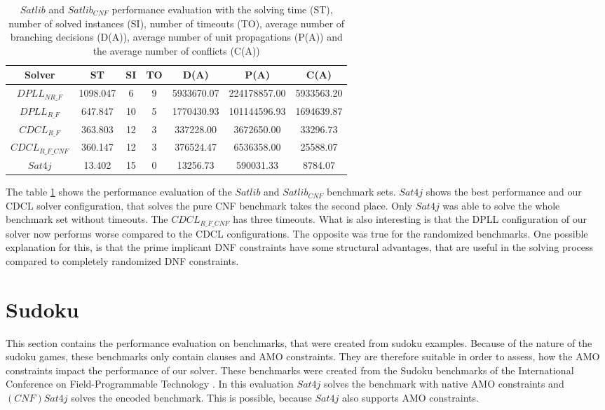 \begin{table}[htb]
\centering
\caption[$Satlib$ and $Satlib_{CNF}$ performance evaluation]{$Satlib$ and $Satlib_{CNF}$ performance evaluation with the solving time (ST), number of solved instances (SI), number of timeouts (TO), average number of branching decisions (D(A)), average number of unit propagations (P(A)) and the average number of conflicts (C(A))}
\label{tab:satlibSat}
\begin{tabular}{|c|c|c|c|c|c|c|}
\hline
Solver & ST & SI & TO & D(A) & P(A) & C(A)\\ 
\hline
$DPLL_{NR\_F}$ & 1098.047 & 6 & 9 & 5933670.07 & 224178857.00 & 5933563.20 \\ 
\hline
$DPLL_{R\_F}$ & 647.847 & 10 & 5 & 1770430.93 & 101144596.93 & 1694639.87 \\ 
\hline
$CDCL_{R\_F}$ & 363.803 & 12 & 3 & 337228.00 & 3672650.00 & 33296.73 \\ 
\hline
$CDCL_{R\_F\_CNF}$ & 360.147 & 12 & 3 & 376524.47 & 6536358.00 & 25588.07 \\ 
\hline
$Sat4j$ & 13.402 & 15 & 0 & 13256.73 & 590031.33 & 8784.07 \\ 
\hline
\end{tabular}
\end{table}

The table \ref{tab:satlibSat} shows the performance evaluation of the $Satlib$ and $Satlib_{CNF}$ benchmark sets. $Sat4j$ shows the best performance and our CDCL solver configuration, that solves the pure CNF benchmark takes the second place. Only $Sat4j$ was able to solve the whole benchmark set without timeouts. The $CDCL_{R\_F\_CNF}$ has three timeouts. What is also interesting is that the DPLL configuration of our solver now performs worse compared to the CDCL configurations. The opposite was true for the randomized benchmarks. One possible explanation for this, is that the prime implicant DNF constraints have some structural advantages, that are useful in the solving process compared to completely randomized DNF constraints.

\section{Sudoku}

This section contains the performance evaluation on benchmarks, that were created from sudoku examples. Because of the nature of the sudoku games, these benchmarks only contain clauses and AMO constraints. They are therefore suitable in order to assess, how the AMO constraints impact the performance of our solver. These benchmarks were created from the Sudoku benchmarks of the International Conference on Field-Programmable Technology \cite{noauthor_international_nodate}. In this evaluation $Sat4j$ solves the benchmark with native AMO constraints and $(CNF)Sat4j$ solves the encoded benchmark. This is possible, because $Sat4j$ also supports AMO constraints.

